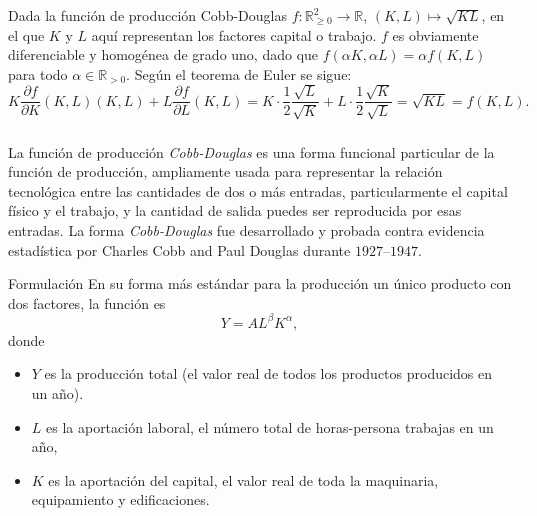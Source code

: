 \begin{frame}
\begin{example}
Dada la función de producción Cobb-Douglas $f\colon\mathds{R}^{2}_{\geq0}\rightarrow\mathds{R}$, $\left(K,L\right)\mapsto\sqrt{KL}$, en el que $K$ y $L$ aquí representan los factores capital o trabajo. $f$ es obviamente diferenciable y homogénea de grado uno, dado que $f\left(\alpha K,\alpha L\right)=\alpha f\left(K,L\right)$ para todo $\alpha\in\mathds{R}_{>0}$. Según el teorema de Euler se sigue: \[ K\frac{\partial f}{\partial K}\left(K, L\right)\left(K,L\right)+L\frac{\partial f}{\partial L}\left(K,L\right)=K\cdot\frac{1}{2}\frac{\sqrt{L}}{\sqrt{K}}+L\cdot\frac{1}{2}\frac{\sqrt{K}}{\sqrt{L}}=\sqrt{KL}=f\left(K,L\right). \]
\end{example}
\end{frame}

\begin{frame}[t]
\frametitle{\secname}

La función de producción \emph{Cobb-Douglas} es una forma funcional particular de la función de producción, ampliamente usada para representar la relación tecnológica entre las cantidades de dos o más entradas, particularmente el capital físico y el trabajo, y la cantidad de salida puedes ser reproducida por esas entradas. La forma \emph{Cobb-Douglas} fue desarrollado y probada contra evidencia estadística por Charles Cobb and Paul Douglas durante $1927$--$1947$.

\begin{block}{Formulación}
En su forma más estándar para la producción un único producto con dos factores, la función es \[ Y=AL^{\beta}K^{\alpha}, \] donde
\begin{itemize}
	\item $Y$ es la producción total (el valor real de todos los productos producidos en un año).
	\item $L$ es la aportación laboral, el número total de horas-persona trabajas en un año,
	\item $K$ es la aportación del capital, el valor real de toda la maquinaria, equipamiento y edificaciones.
\end{itemize}
\end{block}
\end{frame}

